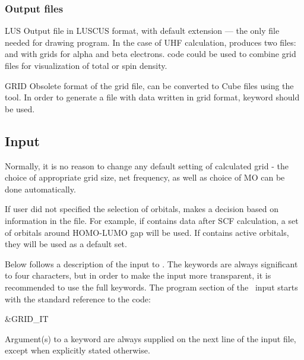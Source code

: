 \subsubsection{Output files}

\begin{filelist}
\item[LUS]
Output file in LUSCUS format, with default extension  --- the only file needed
for drawing program. In the case of
UHF calculation,  produces two files:  and
 with grids for alpha and beta electrons.
 code could be used to combine grid files
for visualization of total or spin density.
\item[GRID]
Obsolete format of the grid file, can be converted to Cube files using 
the  tool. In order to generate a file with data
written in grid format, keyword  should be used.
\end{filelist}

\subsection{Input}
\label{UG:sec:gridit_input}

Normally, it is no reason to change any default setting of calculated
grid - the choice of appropriate grid size, net frequency, as well as
choice of MO can be done automatically.

If user did not specified the selection of orbitals, 
makes a decision based on information in the  file. For example,
if  contains data after SCF calculation, a set of orbitals
around HOMO-LUMO gap will be used. If  contains active orbitals,
they will be used as a default set.

Below follows a description of the input to . The keywords
are always significant to four characters, but in order to make the
input more transparent, it is recommended to use the full keywords.
The  program section of the \molcas\ input starts with the
standard reference to the code:
\begin{inputlisting}
 &GRID_IT
\end{inputlisting}

Argument(s) to a keyword are always supplied on the next line of the
input file, except when explicitly stated otherwise.

